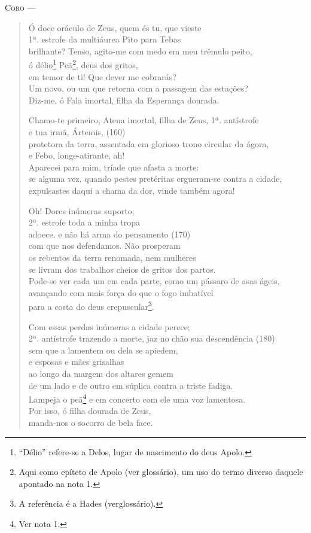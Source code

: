 \textsc{Coro} --- \begin{verse}Ó doce oráculo de Zeus, quem és tu, que vieste\\ 1ª. estrofe
da multiáurea Pito para Tebas\\
brilhante? Tenso, agito-me com medo em meu trêmulo peito,\\
ó délio\footnote{``Délio'' refere-se a Delos, lugar de nascimento do
deus Apolo.} Peã\footnote{Aqui como epíteto de Apolo (ver glossário),
um uso do termo diverso daquele apontado na nota 1.}, deus dos gritos,\\
em temor de ti! Que dever me cobrarás?\\
Um novo, ou um que retorna com a passagem das estações?\\
Diz-me, ó Fala imortal, filha da Esperança dourada.

Chamo-te primeiro, Atena imortal, filha de Zeus, 1ª. antístrofe\\
e tua irmã, Ártemis, (160)\\
protetora da terra, assentada em glorioso trono circular da ágora,\\
e Febo, longe-atirante, ah!\\
Aparecei para mim, tríade que afasta a morte:\\
se alguma vez, quando pestes pretéritas ergueram-se contra a cidade,\\
expulsastes daqui a chama da dor, vinde também agora!

Oh! Dores inúmeras suporto;\\ 2ª. estrofe
toda a minha tropa\\
adoece, e não há arma do pensamento (170)\\
com que nos defendamos. Não prosperam\\
os rebentos da terra renomada, nem mulheres\\
se livram dos trabalhos cheios de gritos dos partos.\\
Pode-se ver cada um em cada parte, como um pássaro de asas ágeis,\\
avançando com mais força do que o fogo imbatível\\
para a costa do deus crepuscular\footnote{A referência é a Hades (verglossário).}.

Com essas perdas inúmeras a cidade perece;\\ 2ª. antístrofe
trazendo a morte, jaz no chão sua descendência (180)\\
sem que a lamentem ou dela se apiedem,\\
e esposas e mães grisalhas\\
ao longo da margem dos altares gemem\\
de um lado e de outro em súplica contra a triste fadiga.\\
Lampeja o peã\footnote{Ver nota 1.} e em concerto com ele uma voz lamentosa.\\
Por isso, ó filha dourada de Zeus,\\
manda-nos o socorro de bela face.


\end{verse}
